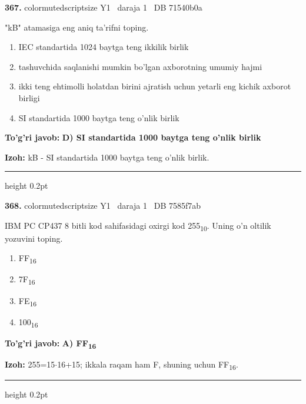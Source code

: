 \documentclass[10pt,a4paper,oneside]{article}
\begin{document}
\noindent\textbf{\color{ink}367.}  {color{muted}scriptsize Y1 \textbullet\ daraja 1 \textbullet\ DB 71540b0a}
\par
"kB" atamasiga eng aniq ta'rifni toping.
\begin{enumerate}[label=\Alph*),leftmargin=9mm]
\item IEC standartida 1024 baytga teng ikkilik birlik
\item tashuvchida saqlanishi mumkin bo'lgan axborotning umumiy hajmi
\item ikki teng ehtimolli holatdan birini ajratish uchun yetarli eng kichik axborot birligi
\item SI standartida 1000 baytga teng o'nlik birlik
\end{enumerate}
\begin{tcolorbox}[enhanced,breakable,colback=teal!4,colframe=teal!50!black,boxrule=0.5pt,arc=1.1mm,left=3mm,right=3mm,top=1.7mm,bottom=1.7mm,before skip=2mm,after skip=2mm]
\textbf{\color{teal}To'g'ri javob:} \textbf{D) SI standartida 1000 baytga teng o'nlik birlik}
\par\smallskip
\textbf{Izoh:} kB - SI standartida 1000 baytga teng o'nlik birlik.
\end{tcolorbox}
\vspace{2mm}\hrule height 0.2pt \vspace{3mm}

\noindent\textbf{\color{ink}368.}  {color{muted}scriptsize Y1 \textbullet\ daraja 1 \textbullet\ DB 7585f7ab}
\par
IBM PC CP437 8 bitli kod sahifasidagi oxirgi kod 255\textsubscript{1}\textsubscript{0}. Uning o'n oltilik yozuvini toping.
\begin{enumerate}[label=\Alph*),leftmargin=9mm]
\item FF\textsubscript{1}\textsubscript{6}
\item 7F\textsubscript{1}\textsubscript{6}
\item FE\textsubscript{1}\textsubscript{6}
\item 100\textsubscript{1}\textsubscript{6}
\end{enumerate}
\begin{tcolorbox}[enhanced,breakable,colback=teal!4,colframe=teal!50!black,boxrule=0.5pt,arc=1.1mm,left=3mm,right=3mm,top=1.7mm,bottom=1.7mm,before skip=2mm,after skip=2mm]
\textbf{\color{teal}To'g'ri javob:} \textbf{A) FF\textsubscript{1}\textsubscript{6}}
\par\smallskip
\textbf{Izoh:} 255=15\ensuremath{\cdot}16+15; ikkala raqam ham F, shuning uchun FF\textsubscript{1}\textsubscript{6}.
\end{tcolorbox}
\vspace{2mm}\hrule height 0.2pt \vspace{3mm}
\end{document}
